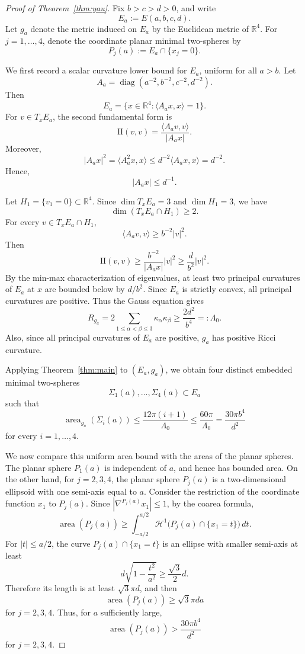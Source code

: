 \documentclass[12pt,english]{amsart}
\theoremstyle{definition}
\begin{document}
\begin{proof}[Proof of Theorem~\ref{thm:yau}]
Fix \(b>c>d>0\), and write
\[
E_a:=E(a,b,c,d).
\]
Let \(g_a\) denote the metric induced on \(E_a\) by the Euclidean metric of
\(\mathbb R^4\). For \(j=1,\ldots,4\), denote the coordinate planar minimal
two-spheres by
\[
P_j(a):=E_a\cap\{x_j=0\}.
\]

We first record a scalar curvature lower bound for \(E_a\), uniform for all
\(a>b\). Let
\[
A_a=\operatorname{diag}(a^{-2},b^{-2},c^{-2},d^{-2}).
\]
Then
\[
E_a=\{x\in\mathbb R^4:\langle A_a x,x\rangle=1\}.
\]
For \(v\in T_xE_a\), the second fundamental form is
\[
\mathrm{II}(v,v)=\frac{\langle A_a v,v\rangle}{|A_a x|}.
\]
Moreover,
\[
|A_a x|^2
=
\langle A_a^2x,x\rangle
\le
d^{-2}\langle A_a x,x\rangle
=
d^{-2}.
\]
Hence,
\[
|A_a x|\le d^{-1}.
\]

Let \(H_1=\{v_1=0\}\subset\mathbb R^4\). Since
\(\dim T_xE_a=3\) and \(\dim H_1=3\), we have
\[
\dim(T_xE_a\cap H_1)\ge2.
\]
For every \(v\in T_xE_a\cap H_1\),
\[
\langle A_a v,v\rangle
\ge
b^{-2}|v|^2.
\]
Then
\[
\mathrm{II}(v,v)
\ge
\frac{b^{-2}}{|A_a x|}|v|^2
\ge
\frac{d}{b^2}|v|^2.
\]
By the min-max characterization of eigenvalues, at least two principal curvatures
of \(E_a\) at \(x\) are bounded below by \(d/b^2\). Since \(E_a\) is strictly convex,
all principal curvatures are positive. Thus the Gauss equation gives
\[
R_{g_a}
=
2\sum_{1\le \alpha<\beta\le3}\kappa_\alpha\kappa_\beta
\ge
\frac{2d^2}{b^4} =: \Lambda_0.
\]
Also, since all principal curvatures of \(E_a\) are positive, \(g_a\) has positive
Ricci curvature.

Applying Theorem~\ref{thm:main} to \((E_a,g_a)\), we obtain four distinct embedded minimal two-spheres
\[
\Sigma_1(a),\ldots,\Sigma_4(a)\subset E_a
\]
such that
\[
\operatorname{area}_{g_a}(\Sigma_i(a))
\le
\frac{12\pi(i+1)}{\Lambda_0}
\le
\frac{60\pi}{\Lambda_0}
=
\frac{30\pi b^4}{d^2}
\]
for every \(i=1,\ldots,4\).

We now compare this uniform area bound with the areas of the planar spheres. The planar sphere \(P_1(a)\) is independent of \(a\), and hence has bounded area. On the other hand, for \(j=2,3,4\), the planar sphere \(P_j(a)\) is a two-dimensional ellipsoid with one semi-axis equal to \(a\). Consider the restriction of the coordinate function \(x_1\) to \(P_j(a)\).
Since \(|\nabla^{P_j(a)}x_1|\le1\), by the coarea formula,
\[
\operatorname{area}(P_j(a))
\ge
\int_{-a/2}^{a/2}
\mathcal H^1\bigl(P_j(a)\cap\{x_1=t\}\bigr)\,dt.
\]
For \(|t|\le a/2\), the curve \(P_j(a)\cap\{x_1=t\}\) is an ellipse with smaller semi-axis at least
\[
d\sqrt{1-\frac{t^2}{a^2}}
\ge
\frac{\sqrt3}{2}d.
\]
Therefore its length is at least \(\sqrt3\pi d\), and then
\[
\operatorname{area}(P_j(a))
\ge
\sqrt3\pi da
\]
for \(j=2,3,4\). Thus, for \(a\) sufficiently large,
\[
\operatorname{area}(P_j(a))
>
\frac{30\pi b^4}{d^2}
\]
for \(j=2,3,4\).


\end{proof}
\end{document}
